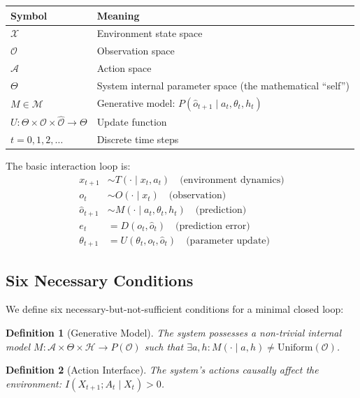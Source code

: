 \documentclass[11pt,a4paper]{article}
\newtheorem{definition}{Definition}
\begin{document}
\begin{table}[h]
\centering
\begin{tabular}{ll}
\toprule
Symbol & Meaning \\
\midrule
$\mathcal{X}$ & Environment state space \\
$\mathcal{O}$ & Observation space \\
$\mathcal{A}$ & Action space \\
$\Theta$ & System internal parameter space (the mathematical ``self'') \\
$M \in \mathcal{M}$ & Generative model: $P(\hat{o}_{t+1} \mid a_t, \theta_t, h_t)$ \\
$U: \Theta \times \mathcal{O} \times \hat{\mathcal{O}} \to \Theta$ & Update function \\
$t = 0, 1, 2, \ldots$ & Discrete time steps \\
\bottomrule
\end{tabular}
\end{table}

The basic interaction loop is:
\begin{align*}
x_{t+1} &\sim T(\cdot \mid x_t, a_t) \quad \text{(environment dynamics)}\\
o_t &\sim O(\cdot \mid x_t) \quad \text{(observation)}\\
\hat{o}_{t+1} &\sim M(\cdot \mid a_t, \theta_t, h_t) \quad \text{(prediction)}\\
e_t &= D(o_t, \hat{o}_t) \quad \text{(prediction error)}\\
\theta_{t+1} &= U(\theta_t, o_t, \hat{o}_t) \quad \text{(parameter update)}
\end{align*}

\subsection{Six Necessary Conditions}

We define six necessary-but-not-sufficient conditions for a minimal closed loop:

\begin{definition}[Generative Model]
The system possesses a non-trivial internal model $M: \mathcal{A} \times \Theta \times \mathcal{H} \to P(\mathcal{O})$ such that $\exists a, h: M(\cdot \mid a, h) \neq \text{Uniform}(\mathcal{O})$.
\end{definition}

\begin{definition}[Action Interface]
The system's actions causally affect the environment: $I(X_{t+1}; A_t \mid X_t) > 0$.
\end{definition}
\end{document}
